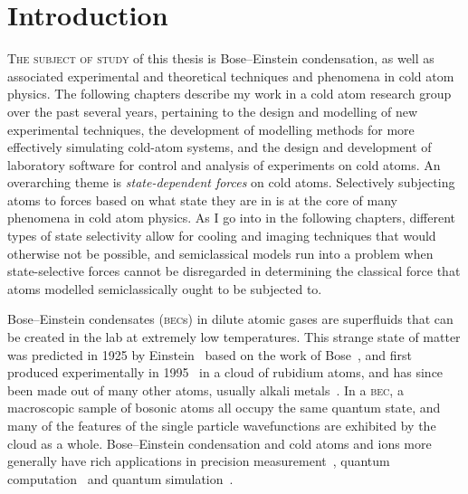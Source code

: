 \chapter{Introduction}\label{chap:introduction}

\lettrine[lines=3]{T}{he subject of study} of this thesis is Bose--Einstein condensation, as well as associated experimental and theoretical techniques and phenomena in cold atom physics. The following chapters describe my work in a cold atom research group over the past several years, pertaining to the design and modelling of new experimental techniques, the development of modelling methods for more effectively simulating cold-atom systems, and the design and development of laboratory software for control and analysis of experiments on cold atoms. An overarching theme is \emph{state-dependent forces} on cold atoms. Selectively subjecting atoms to forces based on what state they are in is at the core of many phenomena in cold atom physics. As I go into in the following chapters, different types of state selectivity allow for cooling and imaging techniques that would otherwise not be possible, and semiclassical models run into a problem when state-selective forces cannot be disregarded in determining the classical force that atoms modelled semiclassically ought to be subjected to.


Bose--Einstein condensates (\textsc{bec}s) in dilute atomic gases are superfluids that can be created in the lab at extremely low temperatures. This strange state of matter was predicted in 1925 by Einstein~\cite{einstein_quantentheorie_1925} based on the work of Bose~\cite{bose_plancks_1924}, and first produced experimentally in 1995~\cite{anderson_observation_1995} in a cloud of rubidium atoms, and has since been made out of many other atoms, usually alkali metals~\cite{davis_bose-einstein_1995, modugno_bose-einstein_2001, bradley_bose-einstein_1997, weber_bose-einstein_2003}. In a \textsc{bec}, a macroscopic sample of bosonic atoms all occupy the same quantum state, and many of the features of the single particle wavefunctions are exhibited by the cloud as a whole. Bose--Einstein condensation and cold atoms and ions more generally have rich applications in precision measurement~\cite{robins_atom_2013, cronin_optics_2009}, quantum computation~\cite{ladd_quantum_2010, negretti_quantum_2011} and quantum simulation~\cite{bloch_quantum_2012, blatt_quantum_2012}.


